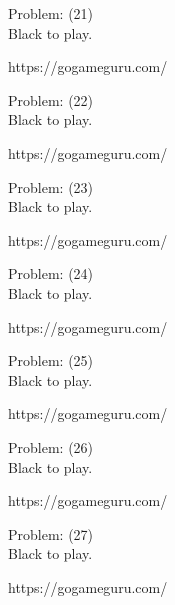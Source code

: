 \documentclass[11pt]{article}
\begin{document}
\begin{minipage}[t]{0.5\textwidth}
  {\centering
  
Problem: (21)\\
Black to play.

https://gogameguru.com/\\
  }
\end{minipage}
\begin{minipage}[t]{0.5\textwidth}
  {\centering
  
Problem: (22)\\
Black to play.

https://gogameguru.com/\\
  }
\end{minipage}
\begin{minipage}[t]{0.5\textwidth}
  {\centering
  
Problem: (23)\\
Black to play.

https://gogameguru.com/\\
  }
\end{minipage}
\begin{minipage}[t]{0.5\textwidth}
  {\centering
  
Problem: (24)\\
Black to play.

https://gogameguru.com/\\
  }
\end{minipage}
\begin{minipage}[t]{0.5\textwidth}
  {\centering
  
Problem: (25)\\
Black to play.

https://gogameguru.com/\\
  }
\end{minipage}
\begin{minipage}[t]{0.5\textwidth}
  {\centering
  
Problem: (26)\\
Black to play.

https://gogameguru.com/\\
  }
\end{minipage}
\begin{minipage}[t]{0.5\textwidth}
  {\centering
  
Problem: (27)\\
Black to play.

https://gogameguru.com/\\
  }
\end{minipage}
\end{document}
